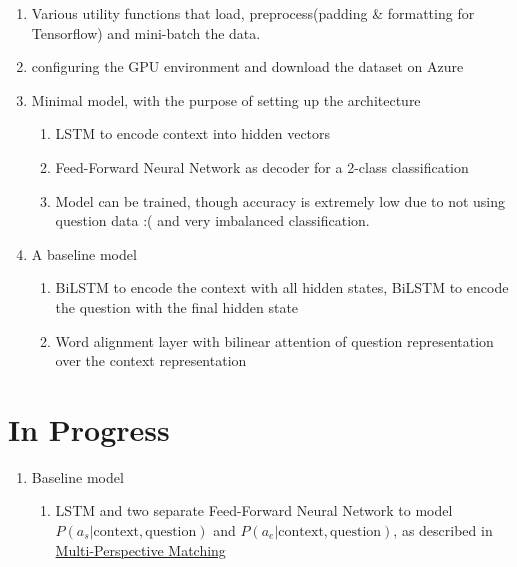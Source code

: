 \documentclass[10pt]{article}
\begin{document}
\begin{enumerate}[label=(\alph*)]
\begin{figure}[ht]
\end{figure}
\item Various utility functions that load, preprocess(padding \& formatting for Tensorflow) and mini-batch the data.
\item configuring the GPU environment and download the dataset on Azure
\item Minimal model, with the purpose of setting up the architecture
\begin{enumerate}[label=(\roman*)]
\item LSTM to encode context into hidden vectors
\item Feed-Forward Neural Network as decoder for a 2-class classification
\item Model can be trained, though accuracy is extremely low due to not using question data :( and very imbalanced classification.
\end{enumerate}
\item A baseline model
\begin{enumerate}[label=(\roman*)]
\item BiLSTM to encode the context with all hidden states, BiLSTM to encode the question with the final hidden state
\item Word alignment layer with bilinear attention of question representation over the context representation 
\end{enumerate}
\end{enumerate}
\section*{In Progress}
\begin{enumerate}[label=(\alph*)]
\item Baseline model
\begin{enumerate}[label=(\roman*)]
\item LSTM and two separate Feed-Forward Neural Network to model $P(a_s|\text{context}, \text{question})$  and $P(a_e|\text{context}, \text{question})$, as described in \hyperlink{https://arxiv.org/abs/1612.04211}{Multi-Perspective Matching}
\end{enumerate}
\end{enumerate}
\end{document}
